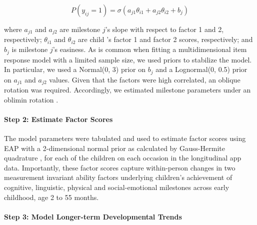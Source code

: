 \documentclass[man, floatsintext]{apa7}
\begin{document}
\begin{equation}
P(y_{ij} = 1) = \sigma(a_{j1}\theta_{i1} + a_{j2}\theta_{i2} + b_j)
\end{equation} 

\noindent where $a_{j1}$ and $a_{j2}$ are milestone $j$'s
slope with respect to factor 1 and 2, respectively; $\theta_{i1}$ and
$\theta_{i2}$ are child 's factor 1 and factor 2 scores, respectively;
and $b_j$ is milestone $j$'s easiness. As is common when fitting a
multidimensional item response model with a limited sample size, we used
priors to stabilize the model. In particular, we used a Normal(0, 3)
prior on $b_j$ and a Lognormal(0, 0.5) prior on $a_{j1}$ and
$a_{j2}$ values. Given that the factors were high correlated, an
oblique rotation was required. Accordingly, we estimated milestone
parameters under an oblimin rotation \parencite{jennrich1966}.

\paragraph{Step 2: Estimate Factor
Scores}
The model parameters were tabulated and used to estimate factor scores
using EAP with a 2-dimensional normal prior as calculated by
Gauss-Hermite quadrature \parencite{embretson2013}, for each of the children on each occasion
in the longitudinal app data. Importantly, these factor scores capture
within-person changes in two measurement invariant ability factors
underlying children's achievement of cognitive, linguistic, physical and
social-emotional milestones across early childhood, age 2 to 55 months.

\paragraph{Step 3: Model Longer-term Developmental Trends}
\end{document}
